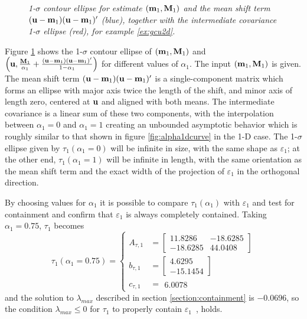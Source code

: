 \begin{example}
\begin{figure}[tbp]
    \caption{\it 1-$\sigma$ contour ellipse for estimate $(\mathbf{m}_1,\mathbf{M}_1)$ and the mean shift term
        $(\mathbf{u}-\mathbf{m}_1)(\mathbf{u}-\mathbf{m}_1)'$ (blue), together with the intermediate covariance 1-$\sigma$ ellipse (red),
        for example \ref{ex:gcu2d}.}
    \label{fig:alpha2d}
\end{figure}
Figure \ref{fig:alpha2d} shows the 1-$\sigma$ contour ellipse of $(\mathbf{m}_1,\mathbf{M}_1)$ and
$\left(\mathbf{u},\frac{\mathbf{M}_1}{\alpha_1}+\frac{(\mathbf{u}-\mathbf{m}_1)(\mathbf{u}-\mathbf{m}_1)'}{1-\alpha_1}\right)$ for different values of
$\alpha_1$. The input $(\mathbf{m}_1,\mathbf{M}_1)$ is given. The mean shift term $(\mathbf{u}-\mathbf{m}_1)(\mathbf{u}-\mathbf{m}_1)'$ is a
single-component matrix which forms an ellipse with major axis twice the length of the shift, and minor axis of
length zero, centered at $\mathbf{u}$ and aligned with both means. The intermediate covariance is a linear sum of these two
components, with the interpolation between $\alpha_1=0$ and $\alpha_1=1$ creating an unbounded asymptotic behavior which
is roughly similar to that shown in figure \ref{fig:alpha1dcurve} in the 1-D case. The 1-$\sigma$ ellipse given by
$\tau_1(\alpha_1=0)$ will be infinite in size, with the same shape as $\varepsilon_1$; at the other end,
$\tau_1(\alpha_1=1)$ will be infinite in length, with the same orientation as the mean shift term and the exact width of
the projection of $\varepsilon_1$ in the orthogonal direction.

By choosing values for $\alpha_1$ it is possible to compare $\tau_1(\alpha_1)$ with $\varepsilon_1$ and test for
containment and confirm that $\varepsilon_1$ is always completely contained. Taking $\alpha_1=0.75$, $\tau_1$ becomes
\begin{equation}
    \tau_1(\alpha_1=0.75)=\left\{
        \begin{aligned}
            A_{\tau,1} &=
            \left[\begin{smallmatrix}
                 11.8286 & -18.6285\\
                -18.6285 &  44.0408
            \end{smallmatrix}\right]\\
            b_{\tau,1} &=
            \left[\begin{smallmatrix}
                  4.6295\\
                -15.1454
            \end{smallmatrix}\right]\\
            c_{\tau,1} &=  \begin{smallmatrix}6.0078\end{smallmatrix}
        \end{aligned}\right.
\end{equation}
and the solution to $\lambda_{max}$ described in section \ref{section:containment} is $-0.0696$, so the condition
$\lambda_{max}\leq 0$ for $\tau_1$ to properly contain $\varepsilon_1$~\cite{eberly00}, holds.


\end{example}


